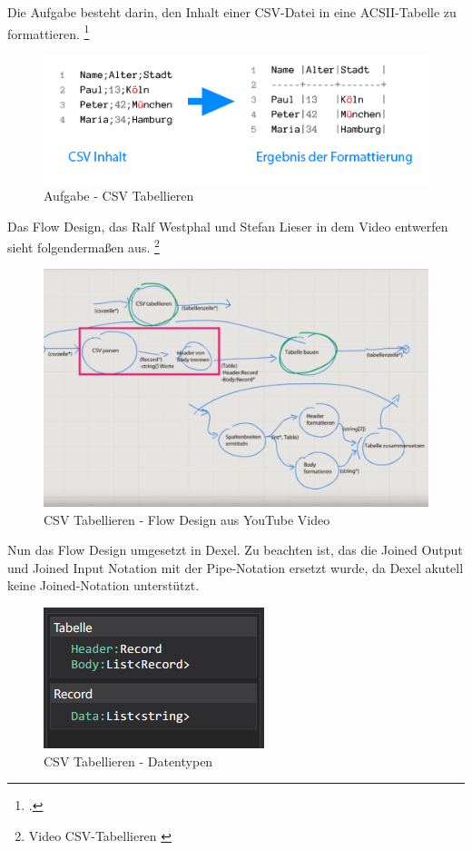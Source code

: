 Die Aufgabe besteht darin, den Inhalt einer CSV-Datei in eine ACSII-Tabelle zu formattieren.
\footcite[S.12]{kata}
\begin{figure}[H]
	\centering
	\includegraphics[width=0.8\linewidth]{./img/csvAufgabe.png}
	\caption{Aufgabe - CSV Tabellieren}
\end{figure}


Das Flow Design, das Ralf Westphal und Stefan Lieser in dem Video entwerfen sieht folgendermaßen aus. \footnote{Video CSV-Tabellieren \cite{youtubevideos}}


\begin{figure}[H]
	\centering
	\includegraphics[width=1\linewidth]{./img/youtubeflowdesign.png}
	\caption{CSV Tabellieren - Flow Design aus YouTube Video}
\end{figure}


Nun das Flow Design umgesetzt in Dexel. Zu beachten ist, das die Joined Output und Joined Input Notation mit der Pipe-Notation ersetzt wurde, da Dexel akutell keine Joined-Notation unterstützt.


\begin{figure}[H]
	\centering
	\includegraphics[width=0.4\linewidth]{./img/csvtabellierenDexelDataTypes.png}
	\caption{CSV Tabellieren - Datentypen}
\end{figure}




